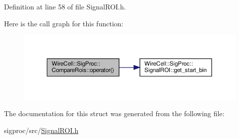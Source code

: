 Definition at line 58 of file Signal\+R\+O\+I.\+h.

Here is the call graph for this function\+:
\nopagebreak
\begin{figure}[H]
\begin{center}
\leavevmode
\includegraphics[width=350pt]{struct_wire_cell_1_1_sig_proc_1_1_compare_rois_aa3d0d0dc9892646208da4a76ec1054c7_cgraph}
\end{center}
\end{figure}


The documentation for this struct was generated from the following file\+:\begin{DoxyCompactItemize}
\item 
sigproc/src/\hyperlink{_signal_r_o_i_8h}{Signal\+R\+O\+I.\+h}\end{DoxyCompactItemize}
